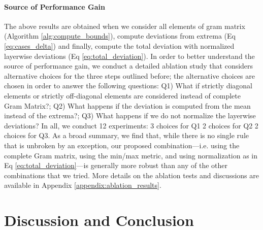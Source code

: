 \documentclass{article}
\begin{document}
\paragraph{Source of Performance Gain} The above results are obtained when we consider all elements of gram matrix (Algorithm \ref{alg:compute_bounds}), compute deviations from extrema (Eq \ref{eq:cases_delta}) and finally, compute the total deviation with normalized layerwise deviations (Eq \ref{eq:total_deviation}). In order to better understand the source of performance gain, we conduct a detailed ablation study that considers alternative choices for the three steps outlined before; the alternative choices are chosen in order to answer the following questions: Q1) What if strictly diagonal elements or strictly off-diagonal elements are considered instead of complete Gram Matrix?; Q2) What happens if the deviation is computed from the mean instead of the extrema?; Q3) What happens if we do not normalize the layerwise deviations? In all, we conduct 12 experiments: 3 choices for Q1  2 choices for Q2  2 choices for Q3. As a broad summary, we find that, while there is no single rule that is unbroken by an exception, our proposed combination---i.e. using the complete Gram matrix, using the min/max metric, and using normalization as in Eq \ref{eq:total_deviation}---is generally more robust than any of the other combinations that we tried. More details on the ablation tests and discussions are available in Appendix \ref{appendix:ablation_results}.

\section{Discussion and Conclusion}
\label{s:discussion}
\end{document}
